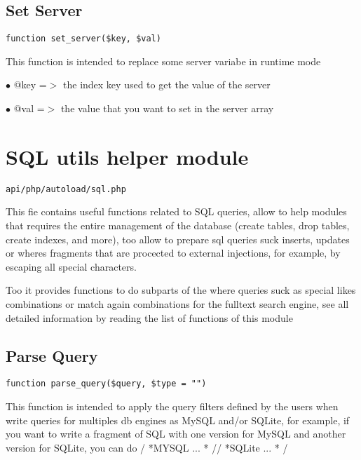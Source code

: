 \documentclass[a4paper]{book}
\begin{document}
\hypertarget{toc243}{}
\subsection{Set Server}

\begin{lstlisting}
function set_server($key, $val)
\end{lstlisting}

This function is intended to replace some server variabe in runtime mode

\begin{compactitem}
\item[\color{myblue}$\bullet$] @key =$>$ the index key used to get the value of the server
\item[\color{myblue}$\bullet$] @val =$>$ the value that you want to set in the server array
\end{compactitem}

\hypertarget{toc244}{}
\section{SQL utils helper module}

\begin{lstlisting}
api/php/autoload/sql.php
\end{lstlisting}

This fie contains useful functions related to SQL queries, allow to help modules that requires
the entire management of the database (create tables, drop tables, create indexes, and more),
too allow to prepare sql queries suck inserts, updates or wheres fragments that are procected
to external injections, for example, by escaping all special characters.

Too it provides functions to do subparts of the where queries suck as special likes combinations
or match again combinations for the fulltext search engine, see all detailed information by
reading the list of functions of this module

\hypertarget{toc245}{}
\subsection{Parse Query}

\begin{lstlisting}
function parse_query($query, $type = "")
\end{lstlisting}

This function is intended to apply the query filters defined by the users
when write queries for multiples db engines as MySQL and/or SQLite, for
example, if you want to write a fragment of SQL with one version for MySQL
and another version for SQLite, you can do / *MYSQL ... * // *SQLite ... * /
\end{document}
